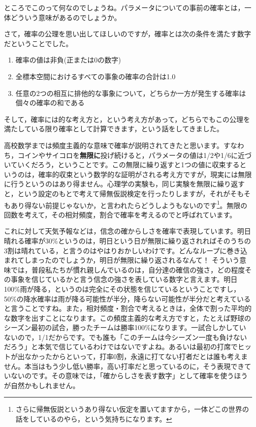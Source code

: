 \documentclass{ltjbook}
\begin{document}
ところでこのって何なのでしょうね。パラメータについての事前の確率とは，一体どういう意味があるのでしょうか。

さて，確率の公理を思い出してほしいのですが，確率とは次の条件を満たす数字だということでした。
\begin{enumerate}
	\item 確率の値は非負(正または0の数字)
	\item 全標本空間におけるすべての事象の確率の合計は1.0
	\item 任意の2つの相互に排他的な事象について，どちらか一方が発生する確率は個々の確率の和である
\end{enumerate}
そして，確率には的な考え方と，という考え方があって，どちらでもこの公理を満たしている限り確率として計算できます，という話をしてきました。

高校数学までは頻度主義的な意味で確率が説明されてきたと思います。すなわち，コインやサイコロを\textbf{無限に}投げ続けると，パラメータの値は1/2や1/6に近づいていくだろう，ということです。この無限に繰り返すと1つの値に収束するというのは，確率的収束という数学的な証明がされる考え方ですが，現実には無限に行うというのはあり得ません。心理学の実験も，同じ実験を無限に繰り返すと，という設定のもとで考えて帰無仮説検定を行ったりしますが，それがそもそもあり得ない前提じゃないか，と言われたらどうしようもないのです\footnote{さらに帰無仮説というあり得ない仮定を置いてますから，一体どこの世界の話をしているのやら，という気持ちになります。}。無限の回数を考えて，その相対頻度，割合で確率を考えるのでと呼ばれています。

これに対して天気予報などは，信念の確からしさを確率で表現しています。明日晴れる確率が30\%というのは，明日という日が無限に繰り返されればそのうちの3割は晴れている，と言うのはやはりおかしいわけです。どんなループに巻き込まれてしまったのでしょうか，明日が無限に繰り返されるなんて！
そういう意味では，普段私たちが慣れ親しんでいるのは，自分達の確信の強さ，どの程度その事象を信じているかと言う信念の強さを表している数字と言えます。明日100\%雨が降る，というのは完全にその状態を信じているということですし，50\%の降水確率は雨が降る可能性が半分，降らない可能性が半分だと考えていると言うことですね。また，相対頻度・割合で考えるときは，全体で割った平均的な数字を出すことになります。この頻度主義的な考え方ですと，たとえば野球のシーズン最初の試合，勝ったチームは勝率100\%になります。一試合しかしていないので，1/1だからです。でも誰も「このチームは今シーズン一度も負けないだろう」と本気で信じているわけではないですよね。あるいは最初の打席でヒットが出なかったからといって，打率0割，永遠に打てない打者だとは誰も考えません。本当はもう少し低い勝率，高い打率だと思っているのに，そう表現できていないのです。その意味では，「確からしさを表す数字」として確率を使うほうが自然かもしれません。
\end{document}
